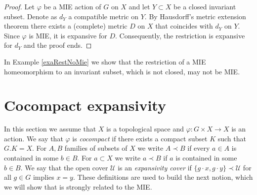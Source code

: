 \documentclass[12pt]{amsart}
\newcommand{\U}{\mathcal U}
\theoremstyle{plain}
\theoremstyle{definition}
\newtheorem{remark}[theorem]{Remark}
\theoremstyle{remark}
\begin{document}
\begin{proof}
Let \( \varphi \) be a MIE action of $G$ on $X$ 
and let \( Y \subset X \) be a closed invariant subset. 
Denote as \( d_Y \) a compatible metric on $Y$. 
By Hausdorff’s metric extension theorem \cites{Hausdorff1930,Torunczyk1972} there exists a (complete) metric \( D \) on \( X \) that coincides with \( d_Y \) on \( Y \). 
Since \( \varphi \) is MIE, 
it is expansive for $D$. Consequently, the restriction is expansive for $d_Y$ and the proof ends.
\end{proof}

In Example \ref{exaRestNoMie} we show that the restriction
of a MIE homeomorphism to an invariant subset, which is not closed, may not be MIE.

\section{Cocompact expansivity}

In this section we assume that \(X\) is a
topological space and \(\varphi : G \times X \to X\) is an action.
We say that \(\varphi\) is \emph{cocompact} if there exists a compact subset  $K$ such that $G.K = X$.
For $A,B$ families of subsets of $X$ we write $A\prec B$ if
every $a\in A$ is contained in some $b\in B$.
For $a\subset X$ we write $a\prec B$ if $a$ is contained in some $b\in B$.
We say that the open cover $\U$ is an \textit{expansivity cover} if
$\{g\cdot x,g\cdot y\}\prec \U$
for all  $g\in G$ implies
$x=y$.
These definitions are used to build the next notion, which we will show that is strongly related to the MIE.
\end{document}
